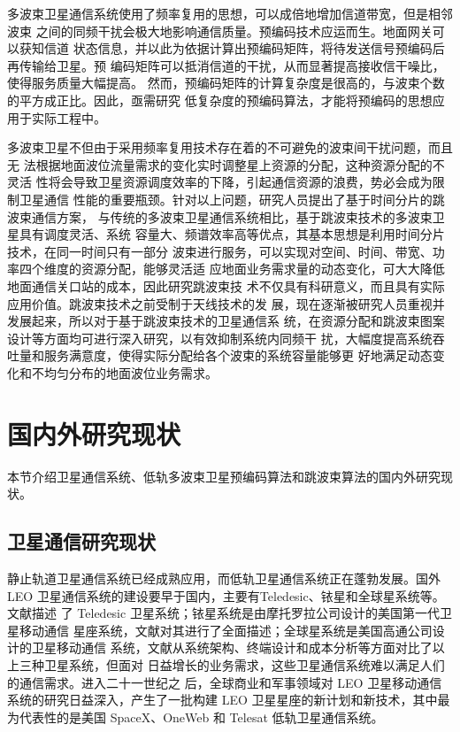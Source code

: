 多波束卫星通信系统使用了频率复用的思想，可以成倍地增加信道带宽，但是相邻波束
之间的同频干扰会极大地影响通信质量。预编码技术应运而生。地面网关可以获知信道
状态信息，并以此为依据计算出预编码矩阵，将待发送信号预编码后再传输给卫星。预
编码矩阵可以抵消信道的干扰，从而显著提高接收信干噪比，使得服务质量大幅提高。
然而，预编码矩阵的计算复杂度是很高的，与波束个数的平方成正比。因此，亟需研究
低复杂度的预编码算法，才能将预编码的思想应用于实际工程中。\par%

多波束卫星不但由于采用频率复用技术存在着的不可避免的波束间干扰问题，而且无
法根据地面波位流量需求的变化实时调整星上资源的分配，这种资源分配的不灵活
性将会导致卫星资源调度效率的下降，引起通信资源的浪费，势必会成为限制卫星通信
性能的重要瓶颈。针对以上问题，研究人员提出了基于时间分片的跳波束通信方案，
与传统的多波束卫星通信系统相比，基于跳波束技术的多波束卫星具有调度灵活、系统
容量大、频谱效率高等优点，其基本思想是利用时间分片技术，在同一时间只有一部分
波束进行服务，可以实现对空间、时间、带宽、功率四个维度的资源分配，能够灵活适
应地面业务需求量的动态变化，可大大降低地面通信关口站的成本，因此研究跳波束技
术不仅具有科研意义，而且具有实际应用价值。跳波束技术之前受制于天线技术的发
展，现在逐渐被研究人员重视并发展起来，所以对于基于跳波束技术的卫星通信系
统，在资源分配和跳波束图案设计等方面均可进行深入研究，以有效抑制系统内同频干
扰，大幅度提高系统吞吐量和服务满意度，使得实际分配给各个波束的系统容量能够更
好地满足动态变化和不均匀分布的地面波位业务需求。\par%
\section{国内外研究现状}
\label{sec:template_download}
本节介绍卫星通信系统、低轨多波束卫星预编码算法和跳波束算法的国内外研究现状。\par
\subsection{卫星通信研究现状}
静止轨道卫星通信系统已经成熟应用，而低轨卫星通信系统正在蓬勃发展。国外LEO 
卫星通信系统的建设要早于国内，主要有Teledesic、铱星和全球星系统等。文献描述
了 Teledesic 卫星系统；铱星系统是由摩托罗拉公司设计的美国第一代卫星移动通信
星座系统，文献对其进行了全面描述；全球星系统是美国高通公司设计的卫星移动通信
系统，文献从系统架构、终端设计和成本分析等方面对比了以上三种卫星系统，但面对
日益增长的业务需求，这些卫星通信系统难以满足人们的通信需求。进入二十一世纪之
后，全球商业和军事领域对 LEO 卫星移动通信系统的研究日益深入，产生了一批构建 
LEO 卫星星座的新计划和新技术，其中最为代表性的是美国 SpaceX、OneWeb 和 
Telesat 低轨卫星通信系统。\par
